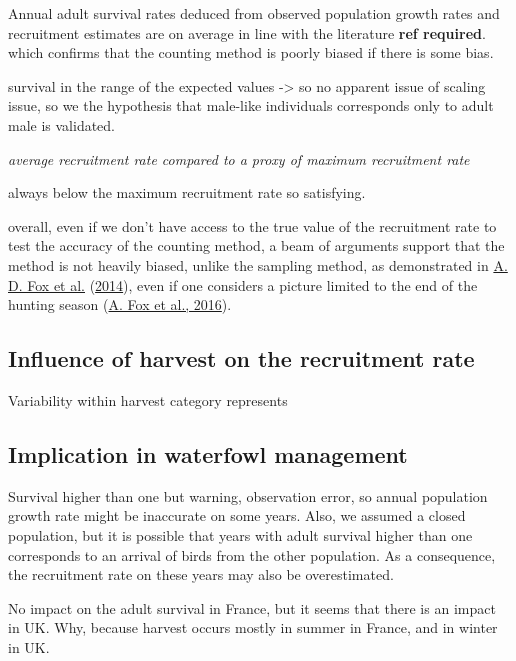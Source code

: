 \documentclass[
  english,
]{article}
\begin{document}
Annual adult survival rates deduced from observed population growth rates and recruitment estimates are on average in line with the literature \textbf{ref required}. which confirms that the counting method is poorly biased if there is some bias.

survival in the range of the expected values -\textgreater{} so no apparent issue of scaling issue,
so we the hypothesis that male-like individuals corresponds only to adult male is validated.

\emph{average recruitment rate compared to a proxy of maximum recruitment rate}

always below the maximum recruitment rate so satisfying.

overall, even if we don't have access to the true value of the recruitment rate to test the accuracy of the counting method, a beam of arguments support that the method is not heavily biased, unlike the sampling method, as demonstrated in \protect\hyperlink{ref-Fox2014}{A. D. Fox et al.} (\protect\hyperlink{ref-Fox2014}{2014}), even if one considers a picture limited to the end of the hunting season (\protect\hyperlink{ref-Fox2016}{A. Fox et al., 2016}).

\hypertarget{influence-of-harvest-on-the-recruitment-rate}{%
\subsection{Influence of harvest on the recruitment rate}\label{influence-of-harvest-on-the-recruitment-rate}}

Variability within harvest category represents

\hypertarget{implication-in-waterfowl-management}{%
\subsection{Implication in waterfowl management}\label{implication-in-waterfowl-management}}

Survival higher than one but warning, observation error, so annual population growth rate might be inaccurate on some years. Also, we assumed a closed population, but it is possible that years with adult survival higher than one corresponds to an arrival of birds from the other population. As a consequence, the recruitment rate on these years may also be overestimated.

No impact on the adult survival in France, but it seems that there is an impact in UK.
Why, because harvest occurs mostly in summer in France, and in winter in UK.
\end{document}
